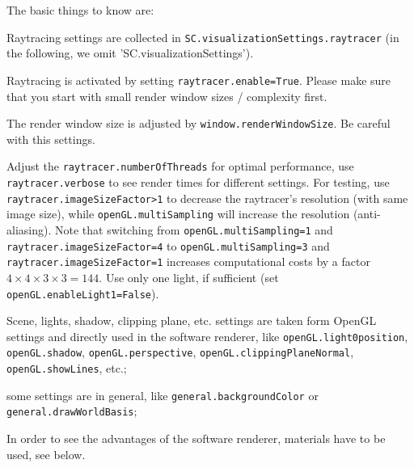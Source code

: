 The basic things to know are:
\bi
  \item Raytracing settings are collected in \texttt{SC.visualizationSettings.raytracer} (in the following, we omit 'SC.visualizationSettings').
  \item Raytracing is activated by setting \texttt{raytracer.enable=True}. Please make sure that you start with small render window sizes / complexity first.
  \item The render window size is adjusted by \texttt{window.renderWindowSize}. Be careful with this settings.
  \item Adjust the \texttt{raytracer.numberOfThreads} for optimal performance, use \texttt{raytracer.verbose} to see render times for different settings. For testing, use \texttt{raytracer.imageSizeFactor>1} to decrease the raytracer's resolution (with same image size), while \texttt{openGL.multiSampling} will increase the resolution (anti-aliasing). Note that switching from \texttt{openGL.multiSampling=1} and \texttt{raytracer.imageSizeFactor=4} to \texttt{openGL.multiSampling=3} and \texttt{raytracer.imageSizeFactor=1} increases computational costs by a factor $4\times 4\times 3\times 3 = 144$. Use only one light, if sufficient (set \texttt{openGL.enableLight1=False}).
  \item Scene, lights, shadow, clipping plane, etc. settings are taken form OpenGL settings and directly used in the software renderer, like \texttt{openGL.light0position}, \texttt{openGL.shadow}, \texttt{openGL.perspective}, \texttt{openGL.clippingPlaneNormal}, \texttt{openGL.showLines}, etc.; 
  \item some settings are in general, like \texttt{general.backgroundColor} or \texttt{general.drawWorldBasis};
  \item In order to see the advantages of the software renderer, materials have to be used, see below.
\ei

